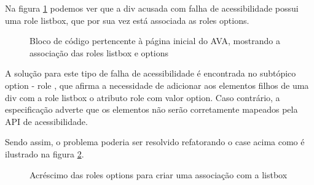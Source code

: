 \documentclass[
	12pt,				%
	openright,			%
	oneside,			%
	a4paper,			%
	chapter=TITLE,		%
	section=TITLE,		%
	subsection=TITLE,	%
	subsubsection=TITLE,%
	english,			%
	brazil				%
	]{abntex2}
\theoremstyle{definition}
\begin{document}
\begin{itemize}
Na figura \ref{Bloco de código pertencente à página inicial do AVA, mostrando a associação das roles listbox e options} podemos ver que a div acusada com falha de acessibilidade possui uma role listbox, que por sua vez está associada as roles options.

\begin{figure}[!h]
\centering
\caption{Bloco de código pertencente à página inicial do AVA, mostrando a associação das roles listbox e options}
\label{Bloco de código pertencente à página inicial do AVA, mostrando a associação das roles listbox e options}
\end{figure}

A solução para este tipo de falha de acessibilidade é encontrada no subtópico option - role \cite{world2014accessible}, que afirma a necessidade de adicionar aos elementos filhos de uma div com a role listbox o atributo role com valor option. Caso contrário, a especificação adverte que os elementos não serão corretamente mapeados pela API de acessibilidade. 

Sendo assim, o problema poderia ser resolvido refatorando o case acima como é ilustrado na figura \ref{Acréscimo das roles options para criar uma associação com a listbox}.

\begin{figure}[!h]
\centering
\caption{Acréscimo das roles options para criar uma associação com a listbox}
\label{Acréscimo das roles options para criar uma associação com a listbox}
\end{figure}


\end{itemize}
\end{document}
